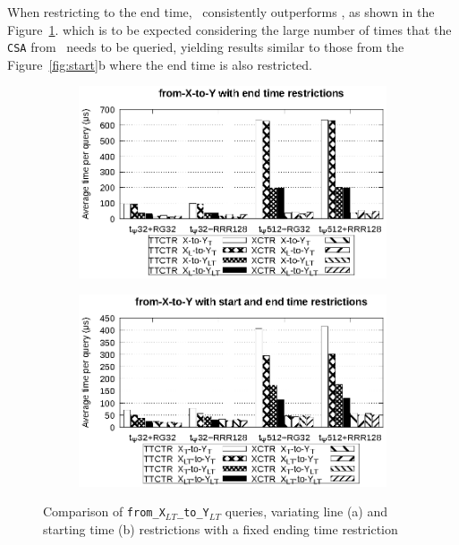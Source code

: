    When restricting to the end time, \ctr~consistently outperforms \ttctr, as shown in the Figure~\ref{fig:xy2}. which is to be expected considering the large number of times that the \texttt{CSA} from \ttctr~needs to be queried, yielding results similar to those from the Figure~\ref{fig:start}b where the end time is also restricted.
    
    \begin{figure}[ht]
    \begin{subfigure}{0.5\linewidth}
    \includegraphics[width=\linewidth]{experiments/xy2.eps}
    \vspace{-12pt}
    \caption{}
    \vspace{-12pt}
    \end{subfigure}%
    \begin{subfigure}{0.5\linewidth}
    \includegraphics[width=\linewidth]{experiments/xy3.eps}
    \vspace{-12pt}
    \caption{}
    \vspace{-12pt}
    \end{subfigure}
    \caption{Comparison of \texttt{from\_X$_{LT}$\_to\_Y$_{LT}$} queries, variating line (a) and starting time (b) restrictions with a fixed ending time restriction}
    \label{fig:xy2}
    \end{figure}
    
